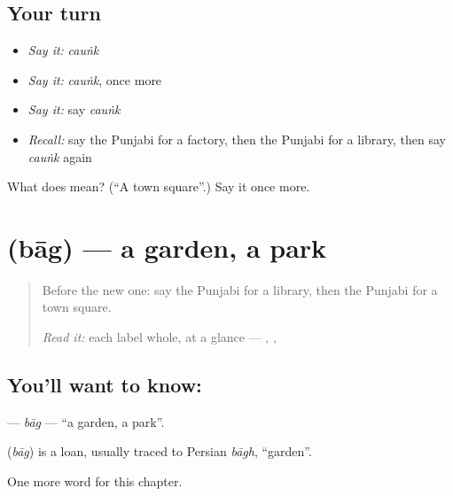 \subsection*{Your turn}
\begin{itemize}
\raggedright
  \item \emph{Say it:} \emph{cauṅk}
  \item \emph{Say it:} \emph{cauṅk}, once more
  \item \emph{Say it:} say \emph{cauṅk}
  \item \emph{Recall:} say the Punjabi for a factory, then the Punjabi for a library, then say \emph{cauṅk} again
\end{itemize}

\begin{tcolorbox}[breakable,colback=teal!4,colframe=teal!35!black,title={Before you move on}]
What does  mean? (\textquotedblleft{}A town square\textquotedblright{}.) Say it once more.
\end{tcolorbox}
\section[\texorpdfstring{\pa{ਬਾਗ਼} (bāg)}{ਬਾਗ਼ (bāg)}]{ (bāg) — a garden, a park}

\label{lesson:PA-C138-bag}



\begin{quote}
Before the new one: say the Punjabi for a library, then the Punjabi for a town square.

\emph{Read it:} each label whole, at a glance — \textbf{}, \textbf{}, \textbf{}
\end{quote}

\subsection*{You'll want to know: }
\textbf{} — \emph{bāg} — \textquotedblleft{}a garden, a park\textquotedblright{}.

\begin{cousinweb}
\textbf{} (\emph{bāg}) is a loan, usually traced to Persian \emph{bāgh}, \textquotedblleft{}garden\textquotedblright{}.
\end{cousinweb}

\begin{grammarlens}[title={What you've built}]
One more word for this chapter.
\end{grammarlens}

